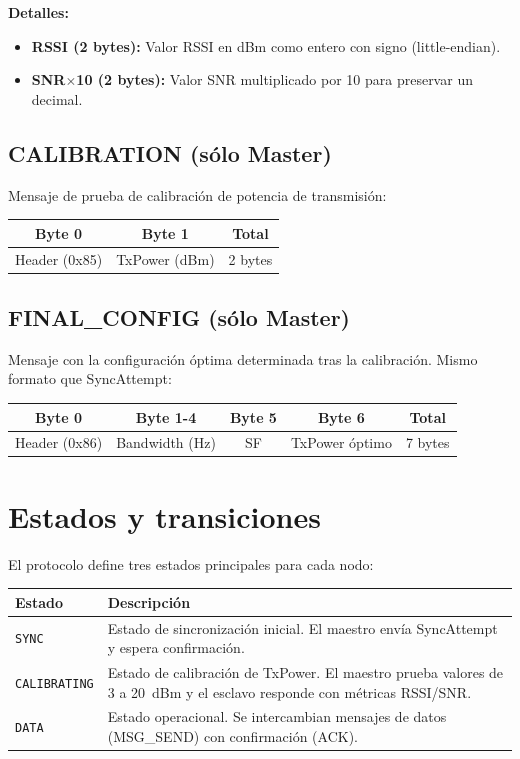 \documentclass[11pt,a4paper]{article}
\begin{document}
\noindent\textbf{Detalles:}
\begin{itemize}
  \item \textbf{RSSI (2 bytes):} Valor RSSI en dBm como entero con signo (little-endian).
  \item \textbf{SNR$\times$10 (2 bytes):} Valor SNR multiplicado por 10 para preservar un decimal.
\end{itemize}

\subsection{CALIBRATION (sólo Master)}
Mensaje de prueba de calibración de potencia de transmisión:

\begin{center}
\begin{tabular}{|c|c|c|}
\hline
\textbf{Byte 0} & \textbf{Byte 1} & \textbf{Total} \\
\hline
Header (0x85) & TxPower (dBm) & 2 bytes \\
\hline
\end{tabular}
\end{center}

\subsection{FINAL\_CONFIG (sólo Master)}
Mensaje con la configuración óptima determinada tras la calibración. Mismo formato que SyncAttempt:

\begin{center}
\begin{tabular}{|c|c|c|c|c|}
\hline
\textbf{Byte 0} & \textbf{Byte 1-4} & \textbf{Byte 5} & \textbf{Byte 6} & \textbf{Total} \\
\hline
Header (0x86) & Bandwidth (Hz) & SF & TxPower óptimo & 7 bytes \\
\hline
\end{tabular}
\end{center}

\section{Estados y transiciones}

El protocolo define tres estados principales para cada nodo:

\begin{center}
\begin{tabular}{|l|p{9cm}|}
\hline
\textbf{Estado} & \textbf{Descripción} \\
\hline
\texttt{SYNC} & Estado de sincronización inicial. El maestro envía SyncAttempt y espera confirmación. \\
\hline
\texttt{CALIBRATING} & Estado de calibración de TxPower. El maestro prueba valores de 3 a 20~dBm y el esclavo responde con métricas RSSI/SNR. \\
\hline
\texttt{DATA} & Estado operacional. Se intercambian mensajes de datos (MSG\_SEND) con confirmación (ACK). \\
\hline
\end{tabular}
\end{center}
\end{document}
